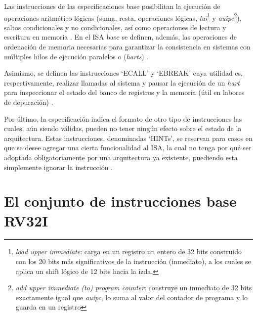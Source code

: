 Las instrucciones de las especificaciones base posibilitan la ejecución de operaciones aritmético-lógicas (suma, resta, operaciones lógicas, \textit{lui}\footnote{\textit{load upper immediate}: carga en un registro un entero de 32 bits construido con los 20 bits más significativos de la instrucción (inmediato), a los cuales se aplica un shift lógico de 12 bits hacia la izda.} y \textit{auipc}\footnote{\textit{add upper immediate (to) program counter}: construye un inmediato de 32 bits exactamente igual que \textit{auipc}, lo suma al valor del contador de programa y lo guarda en un registro}), saltos condicionales y no condicionales, así como operaciones de lectura y escritura en memoria \cite{riscv-unpriv-isa-20250508-unpriv-isa-arit-instr}. En el ISA base se definen, además, las operaciones de ordenación de memoria necesarias para garantizar la consistencia en sistemas con múltiples hilos de ejecución paralelos o (\textit{harts}) \cite{riscv-unpriv-isa-20250508-unpriv-isa-mem-order}.

Asimismo, se definen las instrucciones `ECALL'  y `EBREAK' cuya utilidad es, respectivamente, realizar llamadas al sistema y pausar la ejecución de un \textit{hart} para inspeccionar el estado del banco de registros y la memoria (útil en labores de depuración) \cite{riscv-unpriv-isa-20250508-unpriv-isa-ecall-ebreak}.

Por último, la especificación indica el formato de otro tipo de instrucciones las cuales, aún siendo válidas, pueden no tener ningún efecto sobre el estado de la arquitectura. Estas instrucciones, denominadas `HINTs', se reservan para casos en que se desee agregar una cierta funcionalidad al ISA, la cual no tenga por qué ser adoptada obligatoriamente por una arquitectura ya existente, puediendo esta simplemente ignorar la instrucción \cite{riscv-unpriv-isa-20250508-unpriv-isa-hint}.

\section{El conjunto de instrucciones base RV32I}





